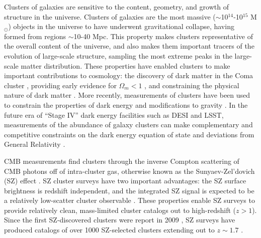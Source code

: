 Clusters of galaxies are sensitive to the content, geometry, and growth of structure in the universe.  
Clusters of galaxies are the most massive ($\sim$10$^{14}$-10$^{15}$ M$_{\odot}$) objects in the universe to have underwent gravitational collapse, 
having formed from regions $\sim$10-40 Mpc.  This property makes clusters representative of the overall content of the universe, and also makes them 
important tracers of the evolution of large-scale structure, sampling the most extreme peaks in the large-scale matter distribution.  
These properties have enabled clusters to make important contributions to cosmology: the discovery of dark matter in the 
Coma cluster \cite{1933AcHPh...6..110Z}, 
providing early evidence for $\Omega_m < 1$ \cite{white93a, Donahue98, Bahcall98}, and
constraining the physical nature of dark matter \cite{Clowe06}.  
More recently, measurements of clusters have been used to constrain the properties of dark energy and modifications 
to gravity \cite{vikhlinin09, mantz10a, rapetti13, benson13, mantz14, mantz15}.   In the future era of ``Stage IV'' dark energy 
facilities such as DESI and LSST, measurements of the abundance of galaxy clusters can make complementary and 
competitive constraints on the dark energy equation of state and deviations from General Relativity \cite{weinberg13}.  

CMB measurements find clusters through the inverse Compton scattering of CMB photons off of intra-cluster gas, otherwise 
known as the Sunyaev-Zel'dovich (SZ) effect \cite{sunyaev72}. SZ cluster surveys have two important advantages: 
the SZ surface brightness is redshift independent, and the integrated SZ signal is expected to be a relatively 
low-scatter cluster observable \cite{nagai06, nagai07, kravtsov12}.  These properties enable SZ surveys to provide 
relatively clean, mass-limited cluster catalogs out to high-redshift ($z > 1$).  Since the first SZ-discovered clusters were 
report in 2009 \cite{staniszewski09}, SZ surveys have produced catalogs of over 1000 SZ-selected clusters extending out to $z \sim 1.7$ 
\cite{vanderlinde10, reichardt13, hasselfield13, planck13-29, bleem15b, planck15-32}.  


